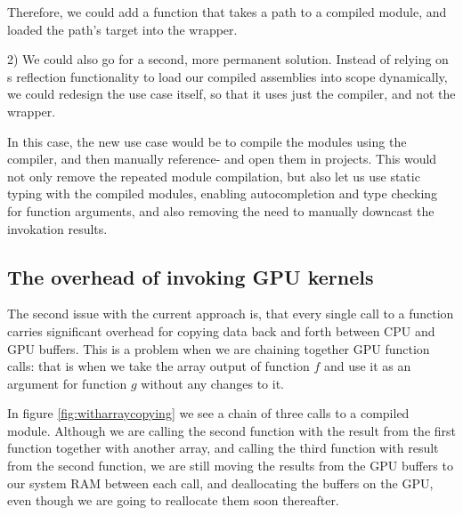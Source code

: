 Therefore, we could add a function that takes a path to a compiled \fshark{}
module, and loaded the path's target into the wrapper.

2) We could also go for a second, more permanent solution. Instead of relying on
\fsharp{}s reflection functionality to load our compiled assemblies into scope
dynamically, we could redesign the \fshark{} use case itself, so that it uses
just the compiler, and not the wrapper.

In this case, the new use case would be to compile the \fshark{} modules using
the \fshark{} compiler, and then manually reference- and open them in \fsharp{} projects.
This would not only remove the repeated module compilation, but also let us use
static typing with the compiled \fshark{} modules, enabling autocompletion and
type checking for function arguments, and also removing the need to manually
downcast the \fshark{} invokation results.

\subsection{The overhead of invoking GPU kernels}
\label{invocationoverhead}
The second issue with the current approach is, that every single call to a
\fshark{} function carries significant overhead for copying data back and forth
between CPU and GPU buffers.
This is a problem when we are chaining together GPU function calls: that is when
we take the array output of function $f$ and use it as an argument for function
$g$ without any changes to it.

In figure \ref{fig:witharraycopying} we see a chain of three calls to a compiled \fshark{} module. 
Although we are calling the second function with the result from the first
function together with another array, and calling the third function with result
from the second function, we are still moving the results from the GPU buffers to our system RAM between each call, and deallocating
the buffers on the GPU, even though we are going to reallocate them soon
thereafter.

